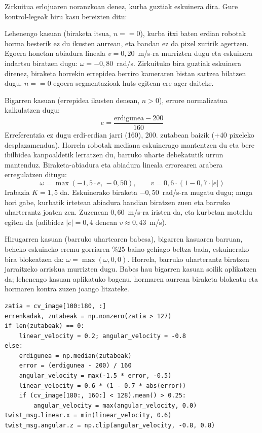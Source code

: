 Zirkuitua erlojuaren noranzkoan denez, kurba guztiak eskuinera dira. Gure kontrol-legeak hiru kasu bereizten ditu:

Lehenengo kasuan (biraketa itsua, $n == 0$), kurba itxi baten erdian robotak horma besterik ez du ikusten aurrean, eta bandan ez da pixel zuririk agertzen. Egoera honetan abiadura lineala $v = 0{,}20$~m/s-ra murrizten dugu eta eskuinera indartsu biratzen dugu: $\omega = -0{,}80$~rad/s. Zirkuituko bira guztiak eskuinera direnez, biraketa horrekin errepidea berriro kameraren bistan sartzea bilatzen dugu. $n == 0$ egoera segmentazioak huts egitean ere ager daiteke.

Bigarren kasuan (errepidea ikusten denean, $n > 0$), errore normalizatua kalkulatzen dugu:
\[
  e = \frac{\text{erdigunea} - 200}{160}
\]
Erreferentzia ez dugu erdi-erdian jarri (160), 200. zutabean baizik (+40 pixeleko desplazamendua). Horrela robotak mediana eskuinerago mantentzen du eta bere ibilbidea kanpoaldetik lerratzen du, barruko uharte debekatutik urrun mantenduz. Biraketa-abiadura eta abiadura lineala errorearen arabera erregulatzen ditugu:
\[
  \omega = \max(-1{,}5 \cdot e,\, -0{,}50), \qquad v = 0{,}6 \cdot (1 - 0{,}7 \cdot |e|)
\]
Irabazia $K = 1{,}5$ da. Eskuinerako biraketa $-0{,}50$~rad/s-ra mugatu dugu; muga hori gabe, kurbatik irtetean abiadura handian biratzen zuen eta barruko uharterantz joaten zen. Zuzenean $0{,}60$~m/s-ra iristen da, eta kurbetan moteldu egiten da (adibidez $|e| = 0{,}4$ denean $v \approx 0{,}43$~m/s).

Hirugarren kasuan (barruko uhartearen babesa), bigarren kasuaren barruan, beheko eskuineko eremu gorriaren \%25 baino gehiago beltza bada, eskuinerako bira blokeatzen da: $\omega = \max(\omega, 0{,}0)$. Horrela, barruko uharterantz biratzen jarraitzeko arriskua murrizten dugu. Babes hau bigarren kasuan soilik aplikatzen da; lehenengo kasuan aplikatuko bagenu, hormaren aurrean biraketa blokeatu eta hormaren kontra zuzen joango litzateke.

\begin{lstlisting}[caption={Errepide-jarraipenaren logika nagusia robot errealean (\texttt{road\_following\_final.py}).},label={lst:road}]
zatia = cv_image[100:180, :]
errenkadak, zutabeak = np.nonzero(zatia > 127)
if len(zutabeak) == 0:
    linear_velocity = 0.2; angular_velocity = -0.8
else:
    erdigunea = np.median(zutabeak)
    error = (erdigunea - 200) / 160
    angular_velocity = max(-1.5 * error, -0.5)
    linear_velocity = 0.6 * (1 - 0.7 * abs(error))
    if (cv_image[180:, 160:] < 128).mean() > 0.25:
        angular_velocity = max(angular_velocity, 0.0)
twist_msg.linear.x = min(linear_velocity, 0.6)
twist_msg.angular.z = np.clip(angular_velocity, -0.8, 0.8)
\end{lstlisting}

